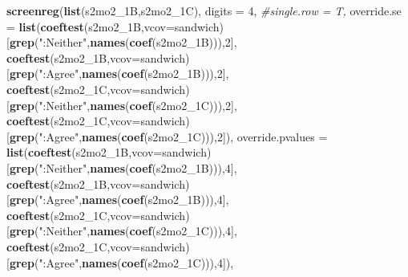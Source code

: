 \documentclass[
]{article}
\newenvironment{Shaded}{\begin{snugshade}}{\end{snugshade}}
\newcommand{\CommentTok}[1]{\textcolor[rgb]{0.56,0.35,0.01}{\textit{#1}}}
\newcommand{\DataTypeTok}[1]{\textcolor[rgb]{0.13,0.29,0.53}{#1}}
\newcommand{\DecValTok}[1]{\textcolor[rgb]{0.00,0.00,0.81}{#1}}
\newcommand{\KeywordTok}[1]{\textcolor[rgb]{0.13,0.29,0.53}{\textbf{#1}}}
\newcommand{\NormalTok}[1]{#1}
\newcommand{\StringTok}[1]{\textcolor[rgb]{0.31,0.60,0.02}{#1}}
\begin{document}
\begin{Shaded}
\begin{Highlighting}[]
\KeywordTok{screenreg}\NormalTok{(}\KeywordTok{list}\NormalTok{(s2mo2_1B,s2mo2_1C), }\DataTypeTok{digits =} \DecValTok{4}\NormalTok{, }\CommentTok{#single.row = T,}
          \DataTypeTok{override.se =} \KeywordTok{list}\NormalTok{(}\KeywordTok{coeftest}\NormalTok{(s2mo2_1B,}\DataTypeTok{vcov=}\NormalTok{sandwich)[}\KeywordTok{grep}\NormalTok{(}\StringTok{":Neither"}\NormalTok{,}\KeywordTok{names}\NormalTok{(}\KeywordTok{coef}\NormalTok{(s2mo2_1B))),}\DecValTok{2}\NormalTok{],}
                             \KeywordTok{coeftest}\NormalTok{(s2mo2_1B,}\DataTypeTok{vcov=}\NormalTok{sandwich)[}\KeywordTok{grep}\NormalTok{(}\StringTok{":Agree"}\NormalTok{,}\KeywordTok{names}\NormalTok{(}\KeywordTok{coef}\NormalTok{(s2mo2_1B))),}\DecValTok{2}\NormalTok{],}
                             \KeywordTok{coeftest}\NormalTok{(s2mo2_1C,}\DataTypeTok{vcov=}\NormalTok{sandwich)[}\KeywordTok{grep}\NormalTok{(}\StringTok{":Neither"}\NormalTok{,}\KeywordTok{names}\NormalTok{(}\KeywordTok{coef}\NormalTok{(s2mo2_1C))),}\DecValTok{2}\NormalTok{],}
                             \KeywordTok{coeftest}\NormalTok{(s2mo2_1C,}\DataTypeTok{vcov=}\NormalTok{sandwich)[}\KeywordTok{grep}\NormalTok{(}\StringTok{":Agree"}\NormalTok{,}\KeywordTok{names}\NormalTok{(}\KeywordTok{coef}\NormalTok{(s2mo2_1C))),}\DecValTok{2}\NormalTok{]),}
          \DataTypeTok{override.pvalues =} \KeywordTok{list}\NormalTok{(}\KeywordTok{coeftest}\NormalTok{(s2mo2_1B,}\DataTypeTok{vcov=}\NormalTok{sandwich)[}\KeywordTok{grep}\NormalTok{(}\StringTok{":Neither"}\NormalTok{,}\KeywordTok{names}\NormalTok{(}\KeywordTok{coef}\NormalTok{(s2mo2_1B))),}\DecValTok{4}\NormalTok{],}
                                  \KeywordTok{coeftest}\NormalTok{(s2mo2_1B,}\DataTypeTok{vcov=}\NormalTok{sandwich)[}\KeywordTok{grep}\NormalTok{(}\StringTok{":Agree"}\NormalTok{,}\KeywordTok{names}\NormalTok{(}\KeywordTok{coef}\NormalTok{(s2mo2_1B))),}\DecValTok{4}\NormalTok{],}
                                  \KeywordTok{coeftest}\NormalTok{(s2mo2_1C,}\DataTypeTok{vcov=}\NormalTok{sandwich)[}\KeywordTok{grep}\NormalTok{(}\StringTok{":Neither"}\NormalTok{,}\KeywordTok{names}\NormalTok{(}\KeywordTok{coef}\NormalTok{(s2mo2_1C))),}\DecValTok{4}\NormalTok{],}
                                  \KeywordTok{coeftest}\NormalTok{(s2mo2_1C,}\DataTypeTok{vcov=}\NormalTok{sandwich)[}\KeywordTok{grep}\NormalTok{(}\StringTok{":Agree"}\NormalTok{,}\KeywordTok{names}\NormalTok{(}\KeywordTok{coef}\NormalTok{(s2mo2_1C))),}\DecValTok{4}\NormalTok{]),}

\end{Highlighting}
\end{Shaded}
\end{document}
